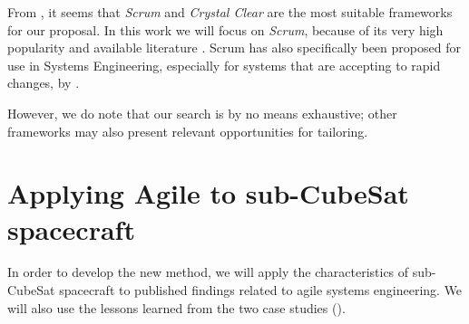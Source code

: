 \documentclass[]{iac}
\def\todo#1{}
\begin{document}
    From , it seems that \emph{Scrum} and \emph{Crystal Clear} are the most suitable frameworks for our proposal. In this work we will focus on \emph{Scrum}, because of its very high popularity and available literature \autocite{noauthor_status_nodate}. Scrum has also specifically been proposed for use in Systems Engineering, especially for systems that are accepting to rapid changes, by \citeauthor{bott_analysis_2019} \autocite{bott_analysis_2019}.
    
    However, we do note that our search is by no means exhaustive; other frameworks may also present relevant opportunities for tailoring.

    









\section{Applying Agile to sub-CubeSat spacecraft}

In order to develop the new method, we will apply the characteristics of sub-CubeSat spacecraft to published findings related to agile systems engineering. We will also use the lessons learned from the two case studies ().
\end{document}
